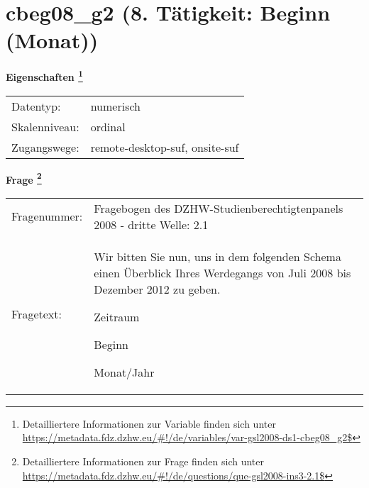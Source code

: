 
    \setcounter{footnote}{0}

    \vspace*{-1.8cm}
	\section{cbeg08\_g2 (8. Tätigkeit: Beginn (Monat))}
	\label{section:cbeg08_g2}



    \vspace*{0.5cm}
    \noindent\textbf{Eigenschaften
	\footnote{Detailliertere Informationen zur Variable finden sich unter
		\url{https://metadata.fdz.dzhw.eu/\#!/de/variables/var-gsl2008-ds1-cbeg08_g2$}}}\\
	\begin{tabularx}{\hsize}{@{}lX}
	Datentyp: & numerisch \\
	Skalenniveau: & ordinal \\
	Zugangswege: &
	  remote-desktop-suf, 
	  onsite-suf
 \\
    \end{tabularx}



				\vspace*{0.5cm}
                \noindent\textbf{Frage
	                \footnote{Detailliertere Informationen zur Frage finden sich unter
		              \url{https://metadata.fdz.dzhw.eu/\#!/de/questions/que-gsl2008-ins3-2.1$}}}\\
				\begin{tabularx}{\hsize}{@{}lX}
					Fragenummer: &
					  Fragebogen des DZHW-Studienberechtigtenpanels 2008 - dritte Welle:
					  2.1
 \\
					Fragetext: & Wir bitten Sie nun, uns in dem folgenden Schema einen Überblick Ihres Werdegangs von Juli 2008 bis Dezember 2012 zu geben.\par  Zeitraum\par  Beginn\par  Monat/Jahr \\
				\end{tabularx}





